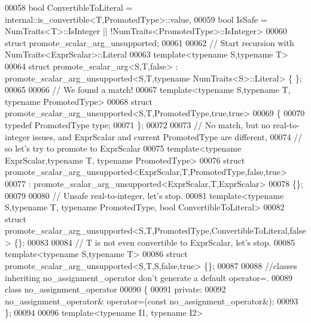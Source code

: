 \begin{DoxyCode}
00058   \textcolor{keywordtype}{bool} ConvertibleToLiteral = internal::is\_convertible<T,PromotedType>::value,
00059   \textcolor{keywordtype}{bool} IsSafe = NumTraits<T>::IsInteger || !NumTraits<PromotedType>::IsInteger>
00060 \textcolor{keyword}{struct }promote\_scalar\_arg\_unsupported;
00061 
00062 \textcolor{comment}{// Start recursion with NumTraits<ExprScalar>::Literal}
00063 \textcolor{keyword}{template}<\textcolor{keyword}{typename} S,\textcolor{keyword}{typename} T>
00064 \textcolor{keyword}{struct }promote\_scalar\_arg<S,T,false> : promote\_scalar\_arg\_unsupported<S,T,typename NumTraits<S>::Literal> \{
      \};
00065 
00066 \textcolor{comment}{// We found a match!}
00067 \textcolor{keyword}{template}<\textcolor{keyword}{typename} S,\textcolor{keyword}{typename} T, \textcolor{keyword}{typename} PromotedType>
00068 \textcolor{keyword}{struct }promote\_scalar\_arg\_unsupported<S,T,PromotedType,true,true>
00069 \{
00070   \textcolor{keyword}{typedef} PromotedType type;
00071 \};
00072 
00073 \textcolor{comment}{// No match, but no real-to-integer issues, and ExprScalar and current PromotedType are different,}
00074 \textcolor{comment}{// so let's try to promote to ExprScalar}
00075 \textcolor{keyword}{template}<\textcolor{keyword}{typename} ExprScalar,\textcolor{keyword}{typename} T, \textcolor{keyword}{typename} PromotedType>
00076 \textcolor{keyword}{struct }promote\_scalar\_arg\_unsupported<ExprScalar,T,PromotedType,false,true>
00077    : promote\_scalar\_arg\_unsupported<ExprScalar,T,ExprScalar>
00078 \{\};
00079 
00080 \textcolor{comment}{// Unsafe real-to-integer, let's stop.}
00081 \textcolor{keyword}{template}<\textcolor{keyword}{typename} S,\textcolor{keyword}{typename} T, \textcolor{keyword}{typename} PromotedType, \textcolor{keywordtype}{bool} ConvertibleToLiteral>
00082 \textcolor{keyword}{struct }promote\_scalar\_arg\_unsupported<S,T,PromotedType,ConvertibleToLiteral,false> \{\};
00083 
00084 \textcolor{comment}{// T is not even convertible to ExprScalar, let's stop.}
00085 \textcolor{keyword}{template}<\textcolor{keyword}{typename} S,\textcolor{keyword}{typename} T>
00086 \textcolor{keyword}{struct }promote\_scalar\_arg\_unsupported<S,T,S,false,true> \{\};
00087 
00088 \textcolor{comment}{//classes inheriting no\_assignment\_operator don't generate a default operator=.}
00089 \textcolor{keyword}{class }no\_assignment\_operator
00090 \{
00091   \textcolor{keyword}{private}:
00092     no\_assignment\_operator& operator=(\textcolor{keyword}{const} no\_assignment\_operator&);
00093 \};
00094 
00096 \textcolor{keyword}{template}<\textcolor{keyword}{typename} I1, \textcolor{keyword}{typename} I2>

\end{DoxyCode}
